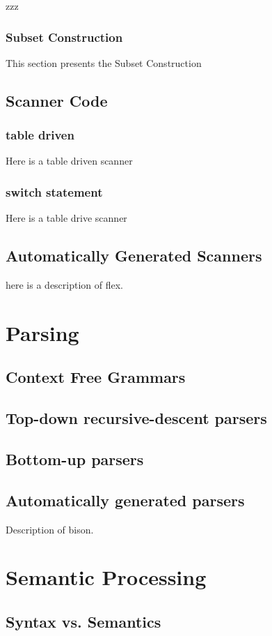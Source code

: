 \documentclass[letterpaper,12pt,openany,reqno]{book}%
\begin{document}
zzz

\section{Subset Construction}

This section presents the Subset Construction

\chapter{Scanner Code}
\section{table driven}
Here is a table driven scanner
\section{switch statement}
Here is a table drive scanner

\chapter{Automatically Generated Scanners}
here is a description of flex.

\part{Parsing} \label{part.parser}
\chapter{Context Free Grammars}
\chapter {Top-down recursive-descent parsers}
\chapter {Bottom-up parsers}
\chapter {Automatically generated parsers}
Description of bison.

\part {Semantic Processing}
\chapter {Syntax vs. Semantics}
\end{document}
